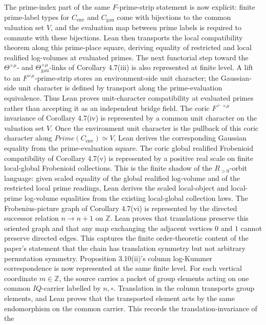 \documentclass[11pt]{article}
\newcommand{\Lean}{Lean}
\theoremstyle{plain}
\theoremstyle{definition}
\theoremstyle{remark}
\begin{document}
The prime-index part of the same \(F\)-prime-strip statement is now explicit:
finite prime-label types for \(C_{\mathrm{env}}\) and \(C_{\mathrm{gau}}\)
come with bijections to the common valuation set \(V\), and the evaluation
map between prime labels is required to commute with these bijections.
\Lean{} then transports the local compatibility theorem along this
prime-place square, deriving equality of restricted and local realified
log-volumes at evaluated primes.
The next functorial step toward the \(\Theta^{\times\mu}\)- and
\(\Theta^{\times\mu}_{\mathrm{gau}}\)-links of Corollary 4.7(iii) is also
represented at finite level.  A lift to an \(F^{\times\mu}\)-prime-strip
stores an environment-side unit character; the Gaussian-side unit character is
defined by transport along the prime-evaluation equivalence.  Thus \Lean{}
proves unit-character compatibility at evaluated primes rather than accepting
it as an independent bridge field.  The coric \(F^{\vdash\times\mu}\)
invariance of Corollary 4.7(iv) is represented by a common unit character on
the valuation set \(V\).  Once the environment unit character is the pullback
of this coric character along \(Prime(C_{\mathrm{env}})\simeq V\), \Lean{}
derives the corresponding Gaussian equality from the prime-evaluation square.
The coric global realified Frobenioid compatibility of Corollary 4.7(v) is
represented by a positive real scale on finite local-global Frobenioid
collections.  This is the finite shadow of the \(R_{>0}\)-orbit language:
given scaled equality of the global realified log-volume and of the restricted
local prime readings, \Lean{} derives the scaled local-object and local-prime
log-volume equalities from the existing local-global collection laws.
The Frobenius-picture graph of Corollary 4.7(vi) is represented by the
directed successor relation \(n\to n+1\) on \(\mathbb{Z}\).  \Lean{} proves
that translations preserve this oriented graph and that any map exchanging
the adjacent vertices \(0\) and \(1\) cannot preserve directed edges.  This
captures the finite order-theoretic content of the paper's statement that the
chain has translation symmetry but not arbitrary permutation symmetry.
Proposition 3.10(ii)'s column log-Kummer correspondence is now represented at
the same finite level.  For each vertical coordinate \(m\in\mathbb Z\), the
source carries a packet of group elements acting on one common \(IQ\)-carrier
labelled by \(n,\circ\).  Translation in the column transports group elements,
and \Lean{} proves that the transported element acts by the same endomorphism
on the common carrier.  This records the translation-invariance of the
\end{document}
